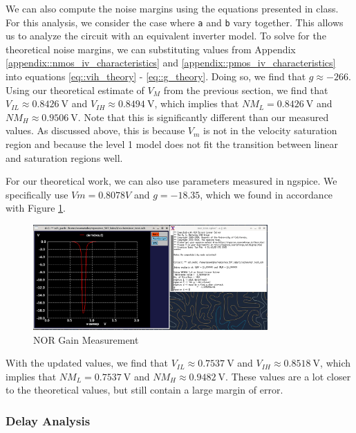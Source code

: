 \documentclass[fleqn]{article}
\begin{document}
	We can also compute the noise margins using the equations presented in class. For this analysis, we consider the case where \texttt{a} and \texttt{b} vary together. This allows us to analyze the circuit with an equivalent inverter model. To solve for the theoretical noise margins, we can substituting values from Appendix \ref{appendix::nmos_iv_characteristics} and \ref{appendix::pmos_iv_characteristics} into equations \ref{eq::vih_theory} - \ref{eq::g_theory}. Doing so, we find that $g \approx -266$. Using our theoretical estimate of $V_{M}$ from the previous section, we find that $V_{IL} \approx 0.8426\ \text{V}$ and $V_{IH} \approx 0.8494\ \text{V}$, which implies that $NM_L = 0.8426\ \text{V}$ and $NM_H \approx 0.9506\ \text{V}$. Note that this is  significantly different than our measured values. As discussed above, this is because $V_m$ is not in the velocity saturation region and because the level 1 model does not fit the transition between linear and saturation regions well.
	
	For our theoretical work, we can also use parameters measured in ngspice. We specifically use $Vm = 0.8078 V$ and $g = -18.35$, which we found in accordance with Figure \ref{fig::nor_noise_analysis_g_sweep_va_vb}.
	
	\begin{figure}[H]
		\centerline{\includegraphics[width=0.8\textwidth]{nor_noise_analysis_g_sweep_va_vb.png}}
		\caption{NOR Gain Measurement}
		\label{fig::nor_noise_analysis_g_sweep_va_vb}
	\end{figure}
	
	\noindent With the updated values, we find that $V_{IL} \approx 0.7537\ \text{V}$ and $V_{IH} \approx 0.8518\ \text{V}$, which implies that $NM_L = 0.7537\ \text{V}$ and $NM_H \approx 0.9482\ \text{V}$. These values are a lot closer to the theoretical values, but still contain a large margin of error.
	
	\subsubsection{Delay Analysis}
	
\end{document}
